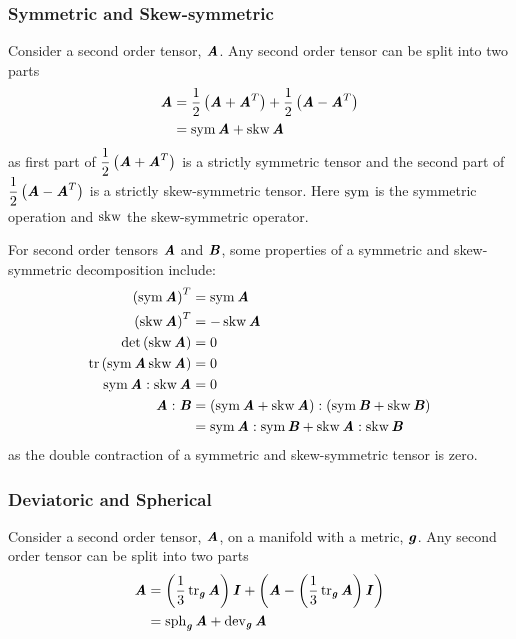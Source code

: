 \subsubsection{Symmetric and Skew-symmetric}
\label{subsubsec:SymmetricSkew}

Consider a second order tensor, $\boldsymbol{\mathit{A}}$. Any second order tensor can be
split into two parts \ie
\begin{align}
  \boldsymbol{\mathit{A}}&=\frac{1}{2}\left( \boldsymbol{\mathit{A}}+{\boldsymbol{\mathit{A}}}^{T} \right)+\frac{1}{2}\left( \boldsymbol{\mathit{A}}-{\boldsymbol{\mathit{A}}}^{T} \right)
  \notag \\
  &= \operatorname{sym} \boldsymbol{\mathit{A}} + \operatorname{skw} \boldsymbol{\mathit{A}} 
\end{align}
as first part of $\dfrac{1}{2}\left( \boldsymbol{\mathit{A}}+{\boldsymbol{\mathit{A}}}^{T} \right)$ is a
strictly symmetric tensor and the second part of
$\dfrac{1}{2}\left( \boldsymbol{\mathit{A}}-{\boldsymbol{\mathit{A}}}^{T} \right)$ is a strictly
skew-symmetric tensor. Here $ \operatorname{sym}  $ is the symmetric operation and $ \operatorname{skw}  $ the
skew-symmetric operator.

For second order tensors $\boldsymbol{\mathit{A}}$ and $\boldsymbol{\mathit{B}}$, some properties of a symmetric and skew-symmetric decomposition include:
\begin{align}
  \transpose{\pbrac{\symmetric{\tensor{A}}}}&=\symmetric{\tensor{A}} \\
  \transpose{\pbrac{\skewsym{\tensor{A}}}}&=-\skewsym{\tensor{A}} \\
  \determinant{\pbrac{\skewsym{\tensor{A}}}}&=0 \\
  \trace{}{\pbrac{\symmetric{\tensor{A}}\skewsym{\tensor{A}}}}&=0\\
  \doubledotprod{\symmetric{\tensor{A}}}{\skewsym{\tensor{A}}}&=0\\
  \doubledotprod{\tensor{A}}{\tensor{B}}&=\doubledotprod{\pbrac{\symmetric{\tensor{A}}+\skewsym{\tensor{A}}}}{\pbrac{\symmetric{\tensor{B}}+\skewsym{\tensor{B}}}} \\
  &=\doubledotprod{\symmetric{\tensor{A}}}{\symmetric{\tensor{B}}}+\doubledotprod{\skewsym{\tensor{A}}}{\skewsym{\tensor{B}}}
\end{align}
as the double contraction of a symmetric and skew-symmetric tensor is zero.

\subsubsection{Deviatoric and Spherical}
\label{subsubsec:DeviatoricSpherical}

Consider a second order tensor, $\boldsymbol{\mathit{A}}$, on a manifold with a metric,
$\boldsymbol{\mathit{g}}$. Any second order tensor can be split into two parts \ie
\begin{align}
  \tensor{A}&=\pbrac{\frac{1}{3}\trace{\tensor{g}}{\tensor{A}}}\tensor{I}+\pbrac{\tensor{A}-\pbrac{\frac{1}{3}\trace{\tensor{g}}{\tensor{A}}}\tensor{I}}
  \notag \\
  &=\spherical{\tensor{g}}{\tensor{A}}+\deviatoric{\tensor{g}}{\tensor{A}}
\end{align}

